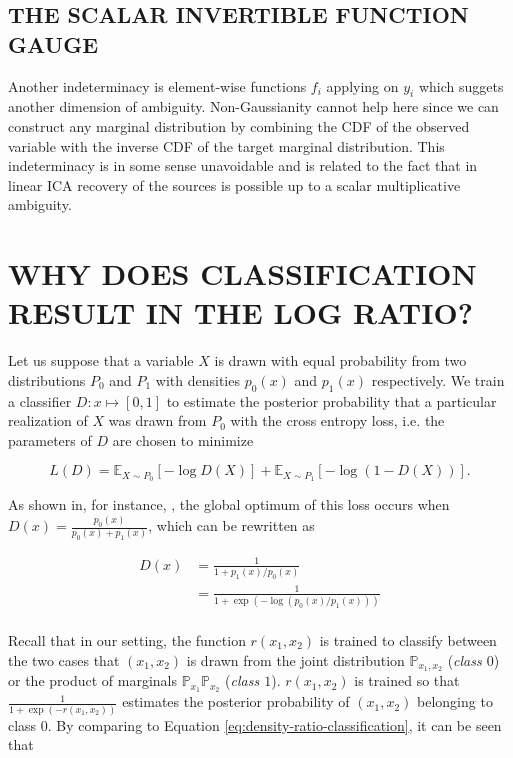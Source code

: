 \documentclass[letterpaper]{article}
\theoremstyle{definition}
\begin{document}
\subsection{THE SCALAR INVERTIBLE FUNCTION GAUGE}
\label{sec:gauge}
Another indeterminacy is element-wise functions $f_i$ applying on $y_i$ which suggets another dimension of ambiguity. Non-Gaussianity cannot help here since we can construct any marginal distribution by combining the CDF of the observed variable with the inverse CDF of the target marginal distribution. This indeterminacy is in some sense unavoidable and is related to the fact that in linear ICA recovery of the sources is possible up to a scalar multiplicative ambiguity.

\section{WHY DOES CLASSIFICATION RESULT IN THE LOG RATIO?}
\label{sec:converged}
Let us suppose that a variable $X$ is drawn with equal probability from two distributions $P_0$ and $P_1$ with densities $p_0(x)$ and $p_1(x)$ respectively.
We train a classifier $D: x \mapsto [0,1]$ to estimate the posterior probability that a particular realization of $X$ was drawn from $P_0$ with the cross entropy loss, i.e. the parameters of $D$ are chosen to minimize

\[
L(D) = \mathbb{E}_{X\sim P_0} \left[ - \log D(X) \right] + \mathbb{E}_{X\sim P_1} \left[ - \log (1 - D(X)) \right].
\]

As shown in, for instance, \cite{goodfellow2014generative}, the global optimum of this loss occurs when $D(x) = \frac{p_0(x)}{p_0(x) + p_1(x)}$, which can be rewritten as

\begin{align}
    D(x) &= \frac{1}{1 + p_1(x)/p_0(x)}\\
    &= \frac{1}{1 + \exp ( - \log (p_0(x)/p_1(x))) } \label{eq:density-ratio-classification}\\
\end{align}

Recall that in our setting, the function $r(x_1, x_2)$ is trained to classify between the two cases that $(x_1, x_2)$ is drawn from the joint distribution $\mathbb{P}_{x_1, x_2}$ (\emph{class $0$}) or the product of marginals $\mathbb{P}_{x_1}\mathbb{P}_{x_2}$ (\emph{class $1$}).
$r(x_1, x_2)$ is trained so that $\frac{1}{1 + \exp(-r(x_1, x_2))}$ estimates the posterior probability of $(x_1, x_2)$ belonging to class 0.
By comparing to Equation \ref{eq:density-ratio-classification}, it can be seen that
\end{document}
